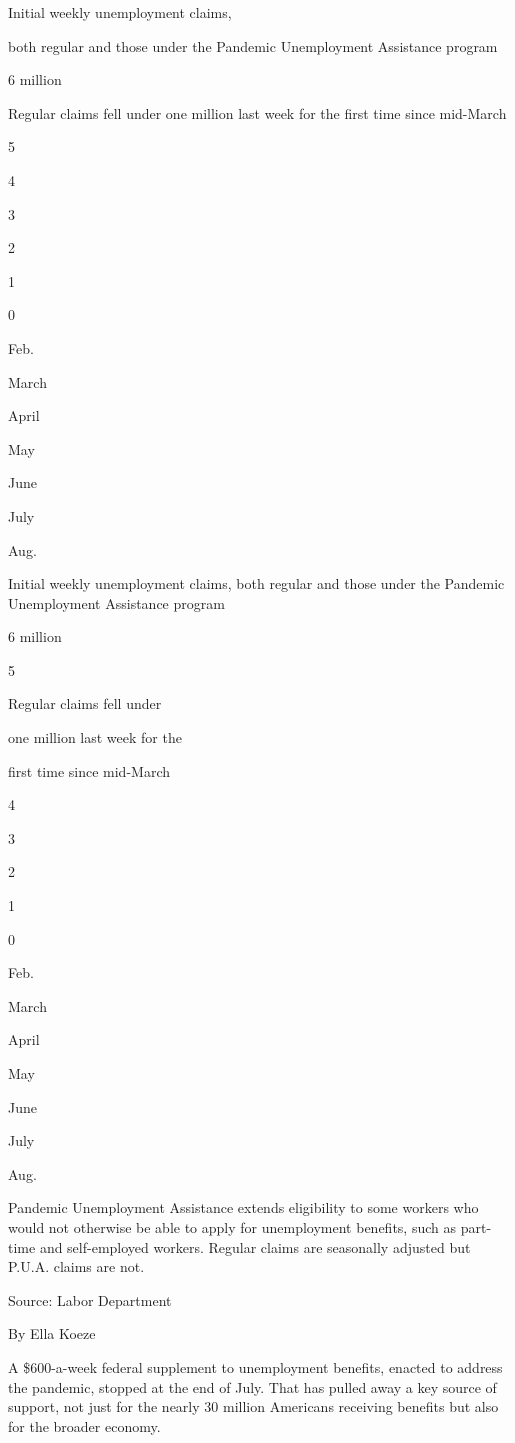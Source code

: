 Initial weekly unemployment claims,

both regular and those under the Pandemic Unemployment Assistance
program

6 million

Regular claims fell under one million last week for the first time since
mid-March

5

4

3

2

1

0

Feb.

March

April

May

June

July

Aug.

Initial weekly unemployment claims, both regular and those under the
Pandemic Unemployment Assistance program

6 million

5

Regular claims fell under

one million last week for the

first time since mid-March

4

3

2

1

0

Feb.

March

April

May

June

July

Aug.

Pandemic Unemployment Assistance extends eligibility to some workers who
would not otherwise be able to apply for unemployment benefits, such as
part-time and self-employed workers. Regular claims are seasonally
adjusted but P.U.A. claims are not.

Source: Labor Department

By Ella Koeze

A \$600-a-week federal supplement to unemployment benefits, enacted to
address the pandemic, stopped at the end of July. That has pulled away a
key source of support, not just for the nearly 30 million Americans
receiving benefits but also for the broader economy.

